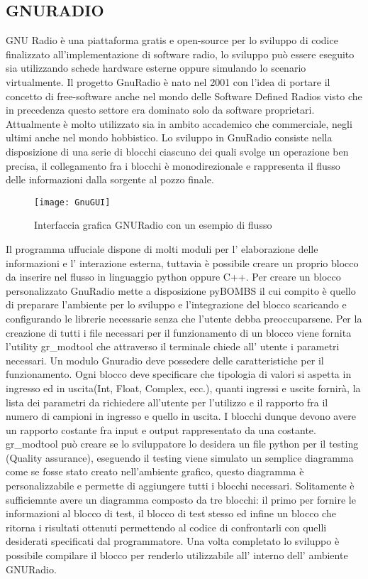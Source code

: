 \begin{itemize}
\chapter{GNURADIO}
GNU Radio è una piattaforma gratis e open-source per lo sviluppo di codice finalizzato all'implementazione di software radio, lo sviluppo può essere eseguito sia utilizzando schede hardware esterne oppure simulando lo scenario virtualmente. Il progetto GnuRadio è nato nel 2001 con l'idea di portare il concetto di free-software anche nel mondo delle Software Defined Radios visto che in precedenza questo settore era dominato solo da software proprietari. Attualmente è molto utilizzato sia in ambito accademico che commerciale, negli ultimi anche nel mondo hobbistico. Lo sviluppo in GnuRadio consiste nella disposizione di una serie di blocchi ciascuno dei quali svolge un operazione ben precisa, il collegamento fra i blocchi è monodirezionale e rappresenta il flusso delle informazioni dalla sorgente al pozzo finale.
\begin{figure}[h]
	\centering
	\texttt{[image: GnuGUI]}
	\caption{Interfaccia grafica GNURadio con un esempio di flusso}\label{fig:1}
\end{figure}

 Il programma uffuciale dispone di molti moduli per l' elaborazione delle informazioni e l' interazione esterna, tuttavia è possibile creare un proprio blocco da inserire nel flusso in linguaggio python oppure C++. Per creare un blocco personalizzato GnuRadio mette a disposizione pyBOMBS il cui compito è quello di preparare l'ambiente per lo sviluppo e l'integrazione del blocco scaricando e configurando le librerie necessarie senza che l'utente debba preoccuparsene.
 Per la creazione di tutti i file necessari per il funzionamento di un blocco viene fornita l'utility gr\_modtool che attraverso il terminale chiede all' utente i parametri necessari. Un modulo Gnuradio deve possedere delle caratteristiche per il funzionamento. Ogni blocco deve specificare che tipologia di valori si aspetta in ingresso ed in uscita(Int, Float, Complex, ecc.), quanti ingressi e uscite fornirà, la lista dei parametri da richiedere all'utente per l'utilizzo e il rapporto fra il numero di campioni in ingresso e quello in uscita. I blocchi dunque devono avere un rapporto costante fra input e output rappresentato da una costante. gr\_modtool può creare se lo sviluppatore lo desidera un file python per il testing (Quality assurance), eseguendo il testing viene simulato un semplice diagramma come se fosse stato creato nell'ambiente grafico, questo diagramma è personalizzabile e permette di aggiungere tutti i blocchi necessari. Solitamente è sufficiemnte avere un diagramma composto da tre blocchi: il primo per fornire le informazioni al blocco di test, il blocco di test stesso ed infine un blocco che ritorna i risultati ottenuti permettendo al codice di confrontarli con quelli desiderati specificati dal programmatore.
 Una volta completato lo sviluppo è possibile compilare il blocco per renderlo utilizzabile all' interno dell' ambiente GNURadio.


\end{itemize}
